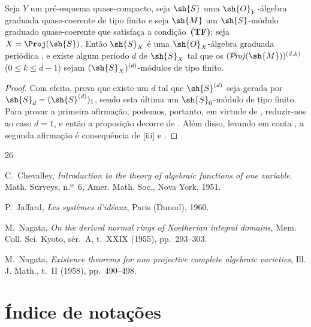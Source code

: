 \documentclass[oneside,10pt]{amsart}
\renewcommand{\leq}{\leqslant}
\def\shProj{\mathcal{P}\!\mathit{roj}}
\newcommand{\oldpage}[2][]{\marginnote{\normalfont\footnotesize\textbf{#1}~|~#2}\ignorespaces}
\let\EGAOriginalLabel\label
\renewcommand{\label}[1]{\phantomsection\EGAOriginalLabel{#1}}
\begin{document}
\begin{proposition}[8.14.14]
\label{II.8.14.14}
Seja $Y$ um pré-esquema quase-compacto, seja $\sh{S}$ uma $\sh{O}_Y$-álgebra graduada quase-coerente de tipo finito e seja $\sh{M}$ um $\sh{S}$-módulo graduado quase-coerente que satisfaça a condição~\textbf{(TF)};
seja $X=\Proj(\sh{S})$.
Então $\sh{S}_X$ é uma $\sh{O}_X$-álgebra graduada periódica , e existe
\oldpage[II]{203}
algum período $d$ de $\sh{S}_X$ tal que os $(\shProj(\sh{M}))^{(d,k)}$ ($0\leq k\leq d-1$) sejam $(\sh{S}_X)^{(d)}$-módulos de tipo finito.
\end{proposition}

\begin{proof}
Com efeito,  prova que existe um $d$ tal que $\sh{S}^{(d)}$ seja gerada por $\sh{S}_d=(\sh{S}^{(d)})_1$, sendo esta última um $\sh{S}_0$-módulo de tipo finito.
Para provar a primeira afirmação, podemos, portanto, em virtude de , reduzir-nos ao caso $d=1$, e então a proposição decorre de .
Além disso, levando em conta , a segunda afirmação é consequência de [iii] e .
\end{proof}
\clearpage
\null
\thispagestyle{empty}
\clearpage
\oldpage[II]{205}
{}
\renewcommand{\refname}{Bibliografia \textit{(continuação)}}

\begin{thebibliography}{26}

C.~Chevalley,
\emph{Introduction to the theory of algebraic functions of one variable}.
Math. Surveys, n.º~6, Amer. Math. Soc., Nova York, 1951.

P.~Jaffard,
\emph{Les systèmes d'idéaux}, Paris (Dunod), 1960.

M.~Nagata,
\emph{On the derived normal rings of Noetherian integral domains},
Mem. Coll. Sci. Kyoto, sér.~A, t.~XXIX (1955), pp.~293--303.

M.~Nagata,
\emph{Existence theorems for non projective complete algebraic varieties},
Ill. J. Math., t.~II (1958), pp.~490--498.

\end{thebibliography}
\clearpage
\oldpage[II]{206}
\clearpage
\oldpage[II]{207}
{}
\section*{Índice de notações}
\end{document}
